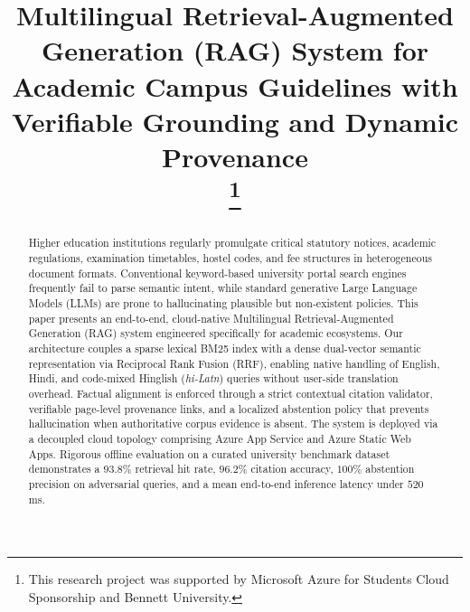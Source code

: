 \documentclass[conference]{IEEEtran}
\begin{document}
\title{Multilingual Retrieval-Augmented Generation (RAG) System for Academic Campus Guidelines with Verifiable Grounding and Dynamic Provenance\\
\thanks{This research project was supported by Microsoft Azure for Students Cloud Sponsorship and Bennett University.}
}

\author{
}

\maketitle

\begin{abstract}
Higher education institutions regularly promulgate critical statutory notices, academic regulations, examination timetables, hostel codes, and fee structures in heterogeneous document formats. Conventional keyword-based university portal search engines frequently fail to parse semantic intent, while standard generative Large Language Models (LLMs) are prone to hallucinating plausible but non-existent policies. This paper presents an end-to-end, cloud-native Multilingual Retrieval-Augmented Generation (RAG) system engineered specifically for academic ecosystems. Our architecture couples a sparse lexical BM25 index with a dense dual-vector semantic representation via Reciprocal Rank Fusion (RRF), enabling native handling of English, Hindi, and code-mixed Hinglish (\textit{hi-Latn}) queries without user-side translation overhead. Factual alignment is enforced through a strict contextual citation validator, verifiable page-level provenance links, and a localized abstention policy that prevents hallucination when authoritative corpus evidence is absent. The system is deployed via a decoupled cloud topology comprising Azure App Service and Azure Static Web Apps. Rigorous offline evaluation on a curated university benchmark dataset demonstrates a $93.8\%$ retrieval hit rate, $96.2\%$ citation accuracy, $100\%$ abstention precision on adversarial queries, and a mean end-to-end inference latency under $520$\,ms.
\end{abstract}
\end{document}
